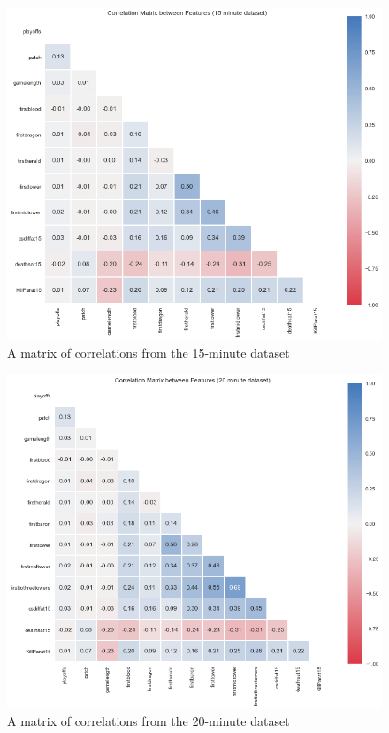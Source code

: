 \begin{figure}[h!]
    \centering
    \includegraphics[width=1\textwidth]{figures/CorrMat15}
    \caption{A matrix of correlations from the 15-minute dataset}
    \label{fig:CorrMat15}
\end{figure}

\begin{figure}[h!]
    \centering
    \includegraphics[width=1\textwidth]{figures/CorrMat20}
    \caption{A matrix of correlations from the 20-minute dataset}
    \label{fig:CorrMat20}
\end{figure}